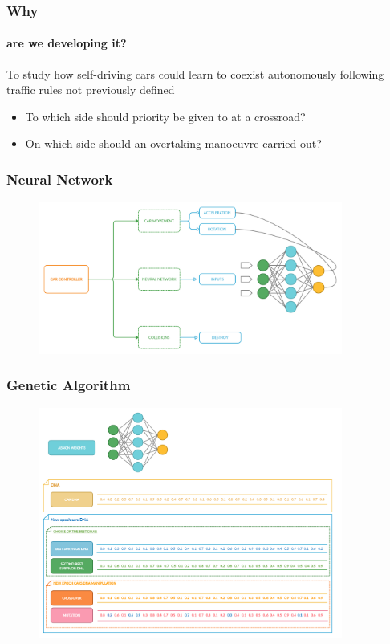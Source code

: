 \documentclass{beamer}
\begin{document}
\begin{frame}
	\frametitle{Why}
	\framesubtitle{are we developing it?}

	\begin{block}{}
		To study how self-driving cars could learn to coexist autonomously following traffic rules not previously defined
		\begin{itemize}
			\item To which side should priority be given to at a crossroad?
			\item On which side should an overtaking manoeuvre carried out?
		\end{itemize}
	\end{block}
\end{frame}

\begin{frame}
	\frametitle{Neural Network}


	\begin{figure}[ht]
		\centering
		\includegraphics[width=10cm]{images/neural_network_scheme.png}
	\end{figure}

\end{frame}

\begin{frame}
	\frametitle{Genetic Algorithm}

	\begin{figure}[ht]
		\centering
		\includegraphics[width=10cm]{images/genetic_algorithm.png}
	\end{figure}

\end{frame}
\end{document}
